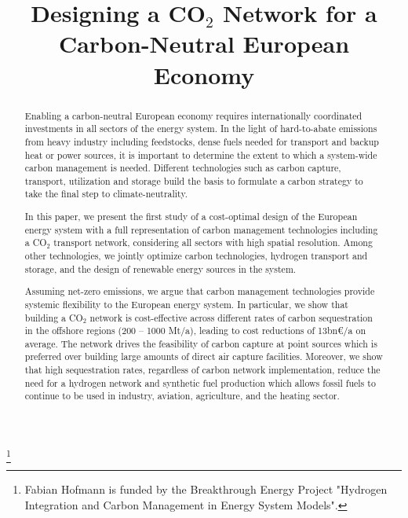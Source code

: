 \documentclass[conference]{IEEEtran}
\newcommand{\carbon}{CO$_2$ }
\begin{document}
\title{Designing a \carbon Network for a Carbon-Neutral European Economy}

\thanks{Fabian Hofmann is funded by the Breakthrough Energy Project "Hydrogen Integration and Carbon Management in Energy System Models".}

\author{
}

\maketitle

\begin{abstract}
    Enabling a carbon-neutral European economy requires internationally coordinated investments in all sectors of the energy system. In the light of hard-to-abate emissions from heavy industry including feedstocks, dense fuels needed for transport and backup heat or power sources, it is important to determine the extent to which a system-wide carbon management is needed. Different technologies such as carbon capture, transport, utilization and storage build the basis to formulate a carbon strategy to take the final step to climate-neutrality.

    In this paper, we present the first study of a cost-optimal design of the European energy system with a full representation of carbon management technologies including a \carbon transport network, considering all sectors with high spatial resolution. Among other technologies, we jointly optimize carbon technologies, hydrogen transport and storage, and the design of renewable energy sources in the system.

    Assuming net-zero emissions, we argue that carbon management technologies provide systemic flexibility to the European energy system. In particular, we show that building a \carbon network is cost-effective across different rates of carbon sequestration in the offshore regions (200 -- 1000 Mt/a), leading to cost reductions of 13bn€/a on average. The network drives the feasibility of carbon capture at point sources which is preferred over building large amounts of direct air capture facilities. Moreover, we show that high sequestration rates, regardless of carbon network implementation, reduce the need for a hydrogen network and synthetic fuel production which allows fossil fuels to continue to be used in industry, aviation, agriculture, and the heating sector.
\end{abstract}
\end{document}
